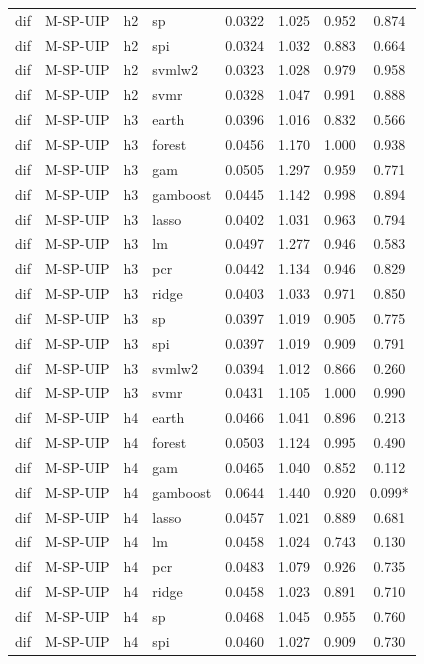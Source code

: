 \begin{ThreePartTable}
\begin{longtable}[t]{llclcccc}
dif & M-SP-UIP & h2 & sp & 0.0322 & 1.025 & 0.952 & 0.874\\
dif & M-SP-UIP & h2 & spi & 0.0324 & 1.032 & 0.883 & 0.664\\
dif & M-SP-UIP & h2 & svmlw2 & 0.0323 & 1.028 & 0.979 & 0.958\\
dif & M-SP-UIP & h2 & svmr & 0.0328 & 1.047 & 0.991 & 0.888\\
\addlinespace
dif & M-SP-UIP & h3 & earth & 0.0396 & 1.016 & 0.832 & 0.566\\
dif & M-SP-UIP & h3 & forest & 0.0456 & 1.170 & 1.000 & 0.938\\
dif & M-SP-UIP & h3 & gam & 0.0505 & 1.297 & 0.959 & 0.771\\
dif & M-SP-UIP & h3 & gamboost & 0.0445 & 1.142 & 0.998 & 0.894\\
dif & M-SP-UIP & h3 & lasso & 0.0402 & 1.031 & 0.963 & 0.794\\
dif & M-SP-UIP & h3 & lm & 0.0497 & 1.277 & 0.946 & 0.583\\
dif & M-SP-UIP & h3 & pcr & 0.0442 & 1.134 & 0.946 & 0.829\\
dif & M-SP-UIP & h3 & ridge & 0.0403 & 1.033 & 0.971 & 0.850\\
dif & M-SP-UIP & h3 & sp & 0.0397 & 1.019 & 0.905 & 0.775\\
dif & M-SP-UIP & h3 & spi & 0.0397 & 1.019 & 0.909 & 0.791\\
dif & M-SP-UIP & h3 & svmlw2 & 0.0394 & 1.012 & 0.866 & 0.260\\
dif & M-SP-UIP & h3 & svmr & 0.0431 & 1.105 & 1.000 & 0.990\\
\addlinespace
dif & M-SP-UIP & h4 & earth & 0.0466 & 1.041 & 0.896 & 0.213\\
dif & M-SP-UIP & h4 & forest & 0.0503 & 1.124 & 0.995 & 0.490\\
dif & M-SP-UIP & h4 & gam & 0.0465 & 1.040 & 0.852 & 0.112\\
dif & M-SP-UIP & h4 & gamboost & 0.0644 & 1.440 & 0.920 & 0.099*\\
dif & M-SP-UIP & h4 & lasso & 0.0457 & 1.021 & 0.889 & 0.681\\
dif & M-SP-UIP & h4 & lm & 0.0458 & 1.024 & 0.743 & 0.130\\
dif & M-SP-UIP & h4 & pcr & 0.0483 & 1.079 & 0.926 & 0.735\\
dif & M-SP-UIP & h4 & ridge & 0.0458 & 1.023 & 0.891 & 0.710\\
dif & M-SP-UIP & h4 & sp & 0.0468 & 1.045 & 0.955 & 0.760\\
dif & M-SP-UIP & h4 & spi & 0.0460 & 1.027 & 0.909 & 0.730\\

\end{longtable}
\end{ThreePartTable}
